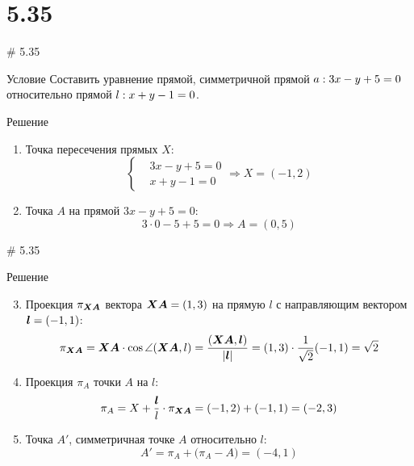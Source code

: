 \documentclass[russian]{beamer}
\begin{document}
  \section{5.35}
  
  \begin{frame}{\# 5.35}
    \begin{block}{Условие}
      Составить уравнение прямой, симметричной прямой $a: 3x \hm- y \hm+ 5 \hm= 0$ относительно прямой $l: x \hm+ y \hm- 1 \hm= 0$.
    \end{block}
    
    \pause
    
    \begin{block}{Решение}
      
      \begin{enumerate}
        \item Точка пересечения прямых $X$:
        \[
          \left\{\begin{aligned}
            &3x - y + 5 = 0\\
            &x + y - 1 = 0
          \end{aligned}\right.
          \Rightarrow X = (-1, 2)
        \]
        
        \pause
        
        \item Точка $A$ на прямой $3x - y + 5 = 0$:
        \[
          3 \cdot 0 - 5 + 5 = 0
          \Rightarrow A = (0, 5)
        \]
      \end{enumerate}
    \end{block}
  \end{frame}
    
    
  \begin{frame}{\# 5.35}
    \begin{block}{Решение}
        
      \begin{enumerate}
         \setcounter{enumi}{2}
          
          \item Проекция $\pi_{\boldsymbol{XA}}$ вектора $\bds{XA} \hm= (1, 3)$ на прямую $l$ с направляющим вектором $\boldsymbol l = (-1, 1)$:
          \[
            \pi_{\boldsymbol{XA}} = \boldsymbol{XA} \cdot \cos \angle(\boldsymbol{XA}, l)
            = \frac{(\boldsymbol{XA}, \boldsymbol l)}{|\boldsymbol l|}
            = (1, 3) \cdot \frac{1}{\sqrt 2} (-1, 1)
            = \sqrt 2
          \]
          
          \pause
          
          \item Проекция $\pi_A$ точки $A$ на $l$:
          \[
            \pi_A = X + \frac{\boldsymbol l}{l} \cdot \pi_{\boldsymbol{XA}}
            = (-1, 2) + (-1, 1) = (-2, 3)
          \]
          
          \pause
          
          \item Точка $A'$, симметричная точке $A$ относительно $l$:
          \[
            A' = \pi_A + \bigl(\pi_A - A\bigr) = (-4, 1)
          \]
      \end{enumerate}
    \end{block}
  \end{frame}
        
\end{document}
